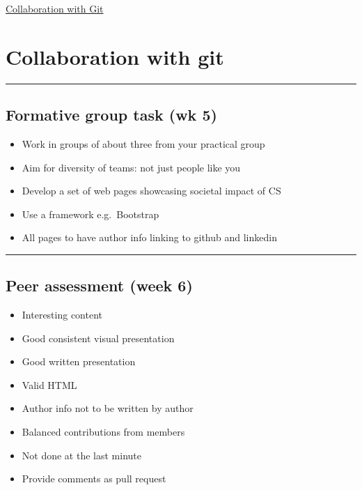 \documentclass{article}[18pt]
\providecommand{\tightlist}{%
  \setlength{\itemsep}{0pt}\setlength{\parskip}{0pt}}
\begin{document}
\begin{center}
\underline{\huge Collaboration with Git}
\end{center}


\hypertarget{collaboration-with-git}{%
\section{Collaboration with git}\label{collaboration-with-git}}

\begin{center}\rule{0.5\linewidth}{\linethickness}\end{center}

\hypertarget{formative-group-task-wk-5}{%
\subsection{Formative group task (wk
5)}\label{formative-group-task-wk-5}}

\begin{itemize}
\tightlist
\item
  Work in groups of about three from your practical group
\item
  Aim for diversity of teams: not just people like you
\item
  Develop a set of web pages showcasing societal impact of CS
\item
  Use a framework e.g.~Bootstrap
\item
  All pages to have author info linking to github and linkedin
\end{itemize}

\begin{center}\rule{0.5\linewidth}{\linethickness}\end{center}

\hypertarget{peer-assessment-week-6}{%
\subsection{Peer assessment (week 6)}\label{peer-assessment-week-6}}

\begin{itemize}
\tightlist
\item
  Interesting content
\item
  Good consistent visual presentation
\item
  Good written presentation
\item
  Valid HTML
\item
  Author info not to be written by author
\item
  Balanced contributions from members
\item
  Not done at the last minute
\item
  Provide comments as pull request
\end{itemize}
\end{document}
